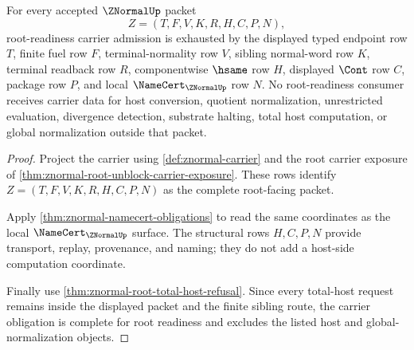 \begin{theorem}
\label{thm:znormal-root-carrier-obligation-completion}
For every accepted $\ZNormalUp$ packet
$$
Z=(T,F,V,K,R,H,C,P,N),
$$
root-readiness carrier admission is exhausted by the displayed typed endpoint row $T$, finite fuel row $F$, terminal-normality row $V$, sibling normal-word row $K$, terminal readback row $R$, componentwise $\hsame$ row $H$, displayed $\Cont$ row $C$, package row $P$, and local $\NameCert_{\ZNormalUp}$ row $N$. No root-readiness consumer receives carrier data for host conversion, quotient normalization, unrestricted evaluation, divergence detection, substrate halting, total host computation, or global normalization outside that packet.
\end{theorem}
\begin{proof}
Project the carrier using \autoref{def:znormal-carrier} and the root carrier exposure of \autoref{thm:znormal-root-unblock-carrier-exposure}. These rows identify $Z=(T,F,V,K,R,H,C,P,N)$ as the complete root-facing packet.

Apply \autoref{thm:znormal-namecert-obligations} to read the same coordinates as the local $\NameCert_{\ZNormalUp}$ surface. The structural rows $H,C,P,N$ provide transport, replay, provenance, and naming; they do not add a host-side computation coordinate.

Finally use \autoref{thm:znormal-root-total-host-refusal}. Since every total-host request remains inside the displayed packet and the finite sibling route, the carrier obligation is complete for root readiness and excludes the listed host and global-normalization objects.
\end{proof}

